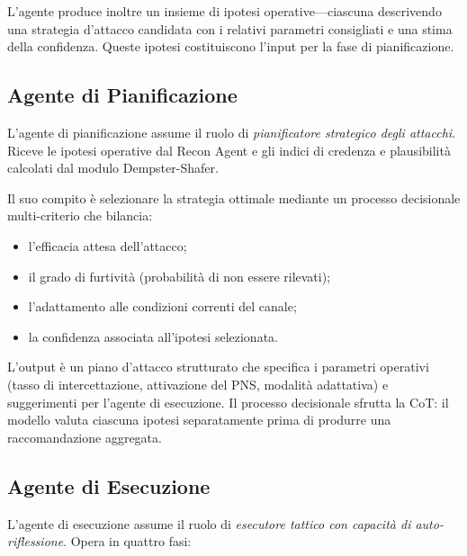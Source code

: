 L'agente produce inoltre un insieme di ipotesi operative---ciascuna descrivendo una strategia d'attacco candidata con i relativi parametri consigliati e una stima della confidenza. Queste ipotesi costituiscono l'input per la fase di pianificazione.

\subsection{Agente di Pianificazione}
\label{subsec:planning-agent}

L'agente di pianificazione assume il ruolo di \emph{pianificatore strategico degli attacchi}. Riceve le ipotesi operative dal Recon Agent e gli indici di credenza e plausibilità calcolati dal modulo Dempster-Shafer.

Il suo compito è selezionare la strategia ottimale mediante un processo decisionale multi-criterio che bilancia:
\begin{itemize}
    \item l'efficacia attesa dell'attacco;
    \item il grado di furtività (probabilità di non essere rilevati);
    \item l'adattamento alle condizioni correnti del canale;
    \item la confidenza associata all'ipotesi selezionata.
\end{itemize}

L'output è un piano d'attacco strutturato che specifica i parametri operativi (tasso di intercettazione, attivazione del PNS, modalità adattativa) e suggerimenti per l'agente di esecuzione. Il processo decisionale sfrutta la CoT: il modello valuta ciascuna ipotesi separatamente prima di produrre una raccomandazione aggregata.

\subsection{Agente di Esecuzione}
\label{subsec:execution-agent}

L'agente di esecuzione assume il ruolo di \emph{esecutore tattico con capacità di auto-riflessione}. Opera in quattro fasi:


